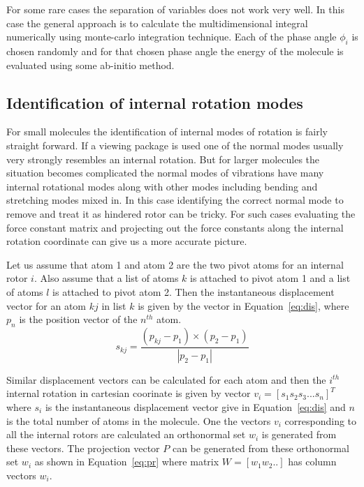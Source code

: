 \documentclass[a4paper,12pt]{article}
\begin{document}
For some rare cases the separation of variables does not work very well. In this case the general approach is to calculate the multidimensional integral numerically using monte-carlo integration technique. Each of the phase angle $\phi_i$ is chosen randomly and for that chosen phase angle the energy of the molecule is evaluated using some ab-initio method.

\subsection{Identification of internal rotation modes}
For small molecules the identification of internal modes of rotation is fairly straight forward. If a viewing package is used one of the normal modes usually very strongly resembles an internal rotation. But for larger molecules the situation becomes complicated the normal modes of vibrations have many internal rotational modes along with other modes including bending and stretching modes mixed in. In this case identifying the correct normal mode to remove and treat it as hindered rotor can be tricky. For such cases evaluating the force constant matrix and projecting out the force constants along the internal rotation coordinate can give us a more accurate picture.

Let us assume that atom 1 and atom 2 are the two pivot atoms for an internal rotor $i$. Also assume that a list of atoms $k$ is attached to pivot atom 1 and a list of atoms $l$ is attached to pivot atom 2. Then the instantaneous displacement vector for an atom $kj$ in list $k$ is given by the vector in Equation~\ref{eq:dis}, where $p_n$ is the position vector of the $n^{th}$ atom.
\begin{equation}
s_{kj} = \frac{(p_{kj}-p_1) \times (p_2-p_1)}{\left|p_2-p_1\right|}
\label{eq:dis}
\end{equation}

Similar displacement vectors can be calculated for each atom and then the $i^{th}$ internal rotation in cartesian coorinate is given by vector $v_i = [s_1 s_2 s_3 ... s_n]^T$ where $s_i$ is the instantaneous displacement vector give in Equation~\ref{eq:dis} and $n$ is the total number of atoms in the molecule. One the vectors $v_i$ corresponding to all the internal rotors are calculated an orthonormal set $w_i$ is generated from these vectors. The projection vector $P$ can be generated from these orthonormal set $w_i$ as shown in Equation~\ref{eq:pr} where matrix $W=[w_1 w_2..]$ has column vectors $w_i$.
\end{document}
